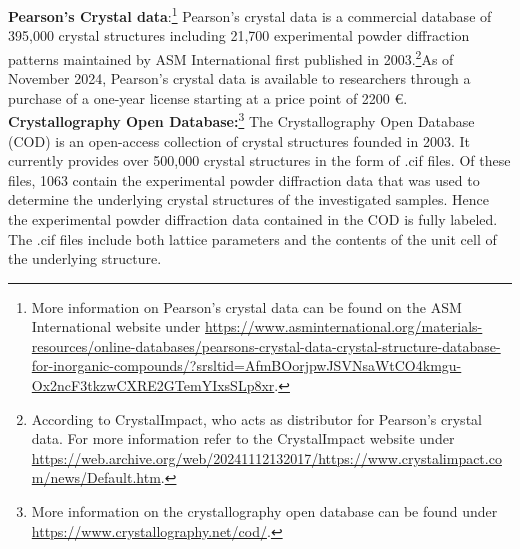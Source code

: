 \textbf{Pearson's Crystal data}:\footnote{More information on Pearson's crystal data can be found on the ASM International website under \url{https://www.asminternational.org/materials-resources/online-databases/pearsons-crystal-data-crystal-structure-database-for-inorganic-compounds/?srsltid=AfmBOorjpwJSVNsaWtCO4kmgu-Ox2ncF3tkzwCXRE2GTemYIxsSLp8xr}.} Pearson's crystal data is a commercial database of 395,000 crystal structures including 21,700 experimental powder diffraction patterns maintained by ASM International first published in 2003.\footnote{According to CrystalImpact, who acts as distributor for Pearson's crystal data. For more information refer to the CrystalImpact website under \url{https://web.archive.org/web/20241112132017/https://www.crystalimpact.com/news/Default.htm}. }As of November 2024, Pearson's crystal data is available to researchers through a purchase of a one-year license starting at a price point of 2200 \euro.\\





\textbf{Crystallography Open Database:}\footnote{More information on the crystallography open database can be found under \url{https://www.crystallography.net/cod/}.} The Crystallography Open Database (COD) is an open-access collection of crystal structures founded in 2003\cite{Graulis2009cod}. It currently provides over 500,000 crystal structures in the form of .cif files. Of these files, 1063 contain the experimental powder diffraction data that was used to determine the underlying crystal structures of the investigated samples. Hence the experimental powder diffraction data contained in the COD is fully labeled. The .cif files include both lattice parameters and the contents of the unit cell of the underlying structure. \\

